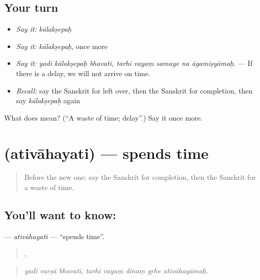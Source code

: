 \subsection*{Your turn}
\begin{itemize}
\raggedright
  \item \emph{Say it:} \emph{kālakṣepaḥ}
  \item \emph{Say it:} \emph{kālakṣepaḥ}, once more
  \item \emph{Say it:} \emph{yadi kālakṣepaḥ bhavati, tarhi vayaṃ samaye na āgamiṣyāmaḥ.} — If there is a delay, we will not arrive on time.
  \item \emph{Recall:} say the Sanskrit for left over, then the Sanskrit for completion, then say \emph{kālakṣepaḥ} again
\end{itemize}

\begin{tcolorbox}[breakable,colback=teal!4,colframe=teal!35!black,title={Before you move on}]
What does  mean? (\textquotedblleft{}A waste of time; delay\textquotedblright{}.) Say it once more.
\end{tcolorbox}
\section[\texorpdfstring{\sk{अतिवाहयति} (ativāhayati)}{अतिवाहयति (ativāhayati)}]{ (ativāhayati) — spends time}

\label{lesson:SA-C540-ativahayati}



\begin{quote}
Before the new one: say the Sanskrit for completion, then the Sanskrit for a waste of time.
\end{quote}

\subsection*{You'll want to know: }
\textbf{} — \emph{ativāhayati} — \textquotedblleft{}spends time\textquotedblright{}.

\begin{quote}
  ,     
\end{quote}

\begin{quote}
\emph{yadi varṣā bhavati, tarhi vayaṃ dinaṃ gṛhe ativāhayāmaḥ.}
\end{quote}

